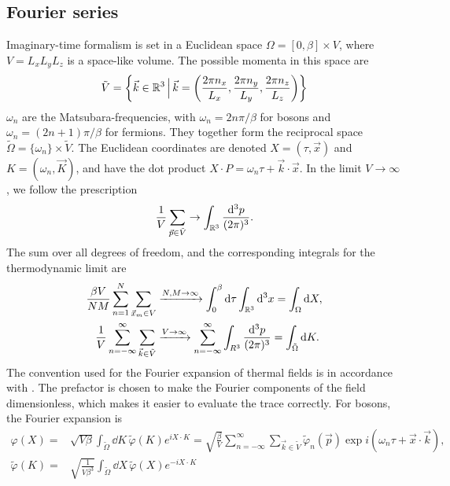 \subsection*{Fourier series}
Imaginary-time formalism is set in a Euclidean space $\Omega = [0, \beta] \times V$,
where  $V = L_xL_yL_z$ is a space-like volume. The possible momenta in this space are
\begin{equation*}
    \tilde V = \left\{ \vec k \in \mathbb{R}^3 \,\Big|\, \vec k = 
    \left(
        \frac{2 \pi n_x}{L_x}, 
        \frac{2 \pi n_y}{L_y},
        \frac{2 \pi n_z}{L_z} 
        \right)
    \right\}
\end{equation*}
$\omega_n$ are the Matsubara-frequencies, with $\omega_n = 2 n \pi / \beta$ for bosons and $\omega_n = (2n + 1) \pi / \beta$ for fermions.
They together form the reciprocal space $\tilde \Omega = \{\omega_n\}\times \tilde V$.
The Euclidean coordinates are denoted $X = (\tau, \vec x)$ and $K = (\omega_n, \vec K)$, and have the dot product $X\cdot P = \omega_n \tau + \vec k \cdot \vec x$.
In the limit $V\rightarrow \infty$, we follow the prescription
\begin{equation*}
    \frac{1}{V} \sum_{\vec p \in \tilde V} \rightarrow \int_{\mathbb{R}^3} 
    \frac{\dd^3 p}{(2 \pi)^3}.
\end{equation*}
The sum over all degrees of freedom, and the corresponding integrals for the thermodynamic limit are
\begin{align*}
     \frac{\beta V}{NM}\sum_{n=1}^N \sum_{\vec x_m \in V} 
    & \xrightarrow{N,M\rightarrow \infty} \int_{0}^\beta \dd \tau \int_{\mathbb{R}^3} \dd^3 x
    = \int_\Omega \dd X, \\
     \frac{1}{V} \sum_{n=-\infty}^\infty \sum_{\vec k \in \tilde V}
    & \xrightarrow{V \rightarrow \infty} \sum_{n=-\infty}^\infty \int_{R^3} \frac{\dd^3 p}{(2 \pi)^3}
    = \int_{\tilde \Omega} \dd K.
\end{align*}
The convention used for the Fourier expansion of thermal fields is in accordance with \cite{Kapusta:finiteTemp}. 
The prefactor is chosen to make the Fourier components of the field dimensionless, which makes it easier to evaluate the trace correctly.
For bosons, the Fourier expansion is
\begin{align*}
    \varphi(X)
    = &
    \sqrt{V \beta} \int_{\tilde \Omega} \dd K \,  \tilde \varphi(K) e^{i X\cdot K}
    =
    \sqrt{\frac{\beta}{V}} \sum_{n=-\infty}^\infty \sum_{\vec k \in \tilde V}
    \tilde \varphi_n(\vec p) \exp{i(\omega_n \tau + \vec x \cdot \vec k)}, \\
    \tilde \varphi(K)
    = &
    \sqrt{\frac{1}{V \beta^3}} \int_{\tilde \Omega} \dd X \,  \tilde \varphi(X) e^{ - i X\cdot K}
\end{align*}
